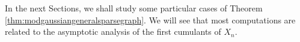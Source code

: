 \documentclass[12pt,a4paper,reqno]{amsart}
\theoremstyle{remark}
\newcommand{\E}{\mathrm{e}}
\begin{document}

In the next Sections, we shall study some particular cases of Theorem \ref{thm:modgaussiangeneralsparsegraph}. 
We will see that most computations are related to the asymptotic analysis of the first cumulants of $X_n$.

\bigskip
\bigskip
\end{document}
